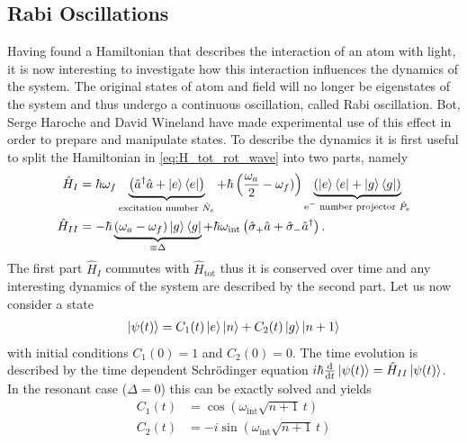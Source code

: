 \subsection{Rabi Oscillations}
Having found a Hamiltonian that describes the interaction of an atom with light,
it is now interesting to investigate how this interaction influences the
dynamics of the system. The original states of atom and field will no longer be
eigenstates of the system and thus undergo a continuous oscillation, called Rabi
oscillation. Bot, Serge Haroche and David Wineland have made experimental use of
this effect in order to prepare and manipulate states. To describe the dynamics
it is first useful to split the Hamiltonian in \eqref{eq:H_tot_rot_wave} into
two parts, namely
\begin{align}
  \label{eq:H_I_H_II}
  \hat{H}_I &= \hbar\omega_f\underbrace{\left( \hat{a}^\dagger\hat{a} +
  \ket{e}\bra{e}\right)}_{\text{excitation number }\hat{N}_e} + \hbar \left( \frac{\omega_a}{2} -
\omega_f)\right)\underbrace{\left(\ket{e}\bra{e} +
\ket{g}\bra{g}\right)}_{\text{e$^-$ number projector }\hat{P}_e} \\
\hat{H}_{II} &= -\hbar \underbrace{\left(\omega_a -
\omega_f\right)\ket{g}\bra{g}}_{\equiv\Delta} +
\hbar\omega_{\text{int}}\left( \hat{\sigma}_+\hat{a} +
  \hat{\sigma}_-\hat{a}^\dagger  \right).
\end{align}
The first part $\hat{H}_I$ commutes with $\hat{H}_{\text{tot}}$ thus it is
conserved over time and any interesting dynamics of the system are described by
the second part. Let us now consider a state
\begin{align}
  \label{eq:psi_t}
  \ket{\psi(t)} = C_1(t)\ket{e}\ket{n} + C_2(t)\ket{g}\ket{n+1} 
\end{align}
with initial conditions $C_1(0) = 1$ and $C_2(0)=0$. The time evolution is
described by the time dependent Schrödinger equation
$i\hbar\frac{\text{d}}{\text{d}t}\ket{\psi(t)}
= \hat{H}_{II}\ket{\psi(t)}$. In the resonant case ($\Delta=0$) this can be
exactly solved and yields
\begin{align}
  \label{eq:psi_t_solution}
  C_1(t) &= \cos\left(\omega_{\text{int}}\sqrt{n+1}\,t\right) \\
  C_2(t) &= -i\sin\left(\omega_\text{int} \sqrt{n+1} \,t\right)
\end{align}


